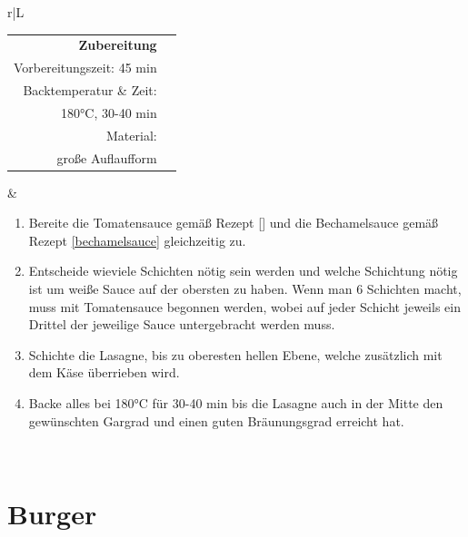 \documentclass[a4paper, 12pt]{scrbook} 								%
\numberwithin{equation}{section} 									%
\begin{document}
					\newpage
					\begin{tabularx}{\textwidth}{r|L}
				
				
					\begin{tabular}[t]{rr}
						\textbf{Zubereitung}	\\
						Vorbereitungszeit: 45 min	\\
						Backtemperatur \& Zeit:	\\180°C, 30-40 min	\\
						Material: \\ große Auflaufform \\
					\end{tabular}			&	\begin{enumerate}[]
													\item Bereite die Tomatensauce gemäß Rezept \ref{} und die Bechamelsauce gemäß Rezept \ref{bechamelsauce} gleichzeitig zu.
													\item Entscheide wieviele Schichten nötig sein werden und welche Schichtung nötig ist um weiße Sauce auf der obersten zu haben. Wenn man 6 Schichten macht, muss mit Tomatensauce begonnen werden, wobei auf jeder Schicht jeweils ein Drittel der jeweilige Sauce untergebracht werden muss.
													\item Schichte die Lasagne, bis zu oberesten hellen Ebene, welche zusätzlich mit dem Käse überrieben wird.
													\item Backe alles bei 180°C für 30-40 min bis die Lasagne auch in der Mitte den gewünschten Gargrad und einen guten Bräunungsgrad erreicht hat.
												\end{enumerate}	\\
				\end{tabularx}
				\newpage


				\section{Burger}	\label{burger}
\end{document}
